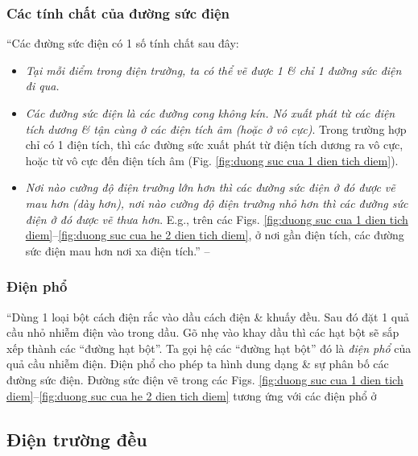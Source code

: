 \documentclass[oneside]{book}
\numberwithin{equation}{section}
\begin{document}
\subsubsection{Các tính chất của đường sức điện}
``Các đường sức điện có 1 số tính chất sau đây:
\begin{itemize}
	\item \textit{Tại mỗi điểm trong điện trường, ta có thể vẽ được 1 \& chỉ 1 đường sức điện đi qua.}
	\item \textit{Các đường sức điện là các đường cong không kín. Nó xuất phát từ các điện tích dương \& tận cùng ở các điện tích âm (hoặc ở vô cực)}. Trong trường hợp chỉ có 1 điện tích, thì các đường sức xuất phát từ điện tích dương ra vô cực, hoặc từ vô cực đến điện tích âm (Fig. \ref{fig:duong suc cua 1 dien tich diem}).
	\item \textit{Nơi nào cường độ điện trường lớn hơn thì các đường sức điện ở đó được vẽ mau hơn (dày hơn), nơi nào cường độ điện trường nhỏ hơn thì các đường sức điện ở đó được vẽ thưa hơn}. E.g., trên các Figs. \ref{fig:duong suc cua 1 dien tich diem}--\ref{fig:duong suc cua he 2 dien tich diem}, ở nơi gần điện tích, các đường sức điện mau hơn nơi xa điện tích.'' --  \cite[p. 15]{SGK_Vat_Ly_11_nang_cao}
\end{itemize}

\subsubsection{Điện phổ}
``Dùng 1 loại bột cách điện rắc vào dầu cách điện \& khuấy đều. Sau đó đặt 1 quả cầu nhỏ nhiễm điện vào trong dầu. Gõ nhẹ vào khay dầu thì các hạt bột sẽ sắp xếp thành các ``đường hạt bột''. Ta gọi hệ các ``đường hạt bột'' đó là \textit{điện phổ} của quả cầu nhiễm điện. Điện phổ cho phép ta hình dung dạng \& sự phân bố các đường sức điện. Đường sức điện vẽ trong các Figs. \ref{fig:duong suc cua 1 dien tich diem}--\ref{fig:duong suc cua he 2 dien tich diem} tương ứng với các điện phổ ở \cite[Hình 3.5: \textsf{Điện phổ của 1 quả cầu nhiễm điện} \& Hình 3.6: \textsf{Điện phổ của 2 quả cầu nhiễm điện cùng \& trái dấu}, p. 16]{SGK_Vat_Ly_11_nang_cao}

\subsection{Điện trường đều}
\end{document}
